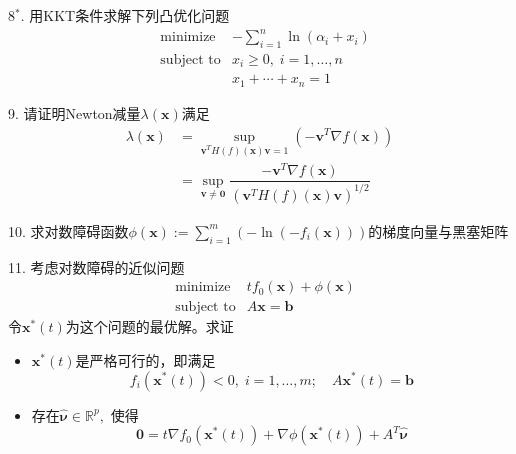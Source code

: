 
\begin{frame}

8$^*$. 用KKT条件求解下列凸优化问题
\begin{eqnarray*}
& \text{minimize} & -\sum\limits_{i=1}^n \ln(\alpha_i + x_i) \\
& \text{subject to} & x_i \ge 0,\; i=1,\ldots,n \\
& & x_1+\cdots+x_n = 1
\end{eqnarray*}

\vspace{1em}

9. 请证明Newton减量$\lambda(\mathbf{x})$满足
\begin{align*}
\lambda(\mathbf{x}) & = \sup\limits_{\mathbf{v}^T H(f)(\mathbf{x}) \mathbf{v} = 1} \left( -\mathbf{v}^T \nabla f(\mathbf{x}) \right) \\
& = \sup\limits_{\mathbf{v} \neq \mathbf{0}} \dfrac{-\mathbf{v}^T \nabla f(\mathbf{x})}{(\mathbf{v}^T H(f)(\mathbf{x}) \mathbf{v})^{1/2}}
\end{align*}

\end{frame}


\begin{frame}

10. 求对数障碍函数$\phi(\mathbf{x}) := \sum\limits_{i=1}^m \left( -\ln(-f_i(\mathbf{x})) \right)$的梯度向量与黑塞矩阵

\vspace{1em}

11. 考虑对数障碍的近似问题
\begin{eqnarray*}
& \text{minimize} & tf_0(\mathbf{x}) + \phi(\mathbf{x}) \\
& \text{subject to} & A\mathbf{x} = \mathbf{b}
\end{eqnarray*}
令$\mathbf{x}^*(t)$为这个问题的最优解。求证
\begin{itemize}
\item[(1)] $\mathbf{x}^*(t)$是严格可行的，即满足
\[f_i(\mathbf{x}^*(t)) < 0, \; i = 1,\ldots,m; \quad A\mathbf{x}^*(t) = \mathbf{b}\]
\item[(2)] 存在$\widehat{\boldsymbol\nu} \in \mathbb{R}^p,$ 使得
\[\mathbf{0} = t \nabla f_0(\mathbf{x}^*(t)) + \nabla \phi(\mathbf{x}^*(t)) + A^T \widehat{\boldsymbol\nu}\]
\end{itemize}

\end{frame}

